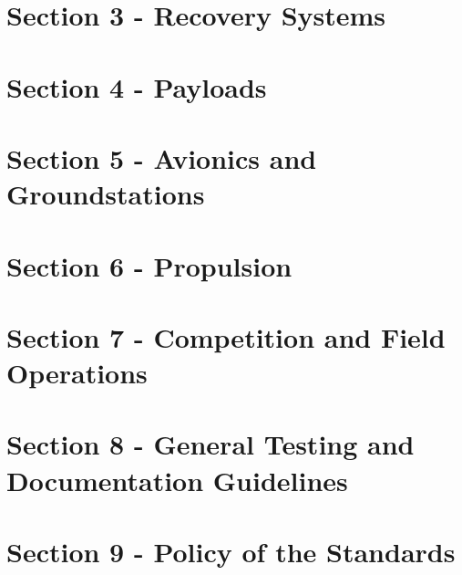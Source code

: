 \documentclass[]{article}
\makeatletter
\newcommand\mainmatter{%
    \cleardoublepage
  \pagenumbering{arabic}}
\newcommand\backmatter{%
  \if@openright
    \cleardoublepage
  \else
    \clearpage
  \fi
   }
\makeatother
\begin{document}
\section{Section 3 - Recovery Systems}\label{section-3}
	
	\clearpage
	
\section{Section 4 - Payloads}\label{section-0}
	
	\clearpage
	
\section{Section 5 - Avionics and Groundstations}\label{section-4}
	
	\clearpage
	
\section{Section 6 - Propulsion}\label{section-5}
	
	\clearpage
	
\section{Section 7 - Competition and Field Operations}\label{section-6}
	
	\clearpage
	
\section{Section 8 - General Testing and Documentation Guidelines}\label{section-7}
	
	\clearpage
	
\section{Section 9 - Policy of the Standards}\label{section-8}
	
	\clearpage

%
%

\mainmatter
\end{document}
